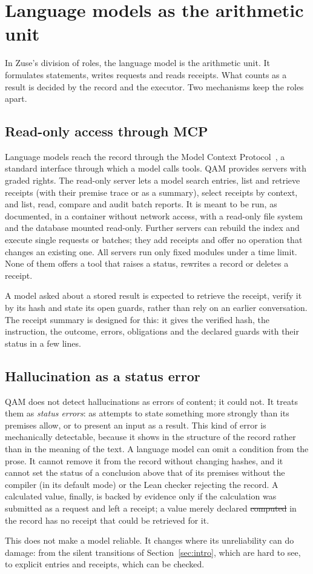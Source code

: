 \section{Language models as the arithmetic unit}\label{sec:llm}

In Zuse's division of roles, the language model is the arithmetic unit. It formulates statements, writes requests and reads receipts.
What counts as a result is decided by the record and the executor. Two mechanisms keep the roles apart.

\subsection{Read-only access through MCP}

Language models reach the record through the Model Context Protocol~\cite{mcp}, a standard interface through which a model calls
tools. QAM provides servers with graded rights. The read-only server lets a model search entries, list and retrieve receipts (with
their premise trace or as a summary), select receipts by context, and list, read, compare and audit batch reports. It is meant to be run, as documented, in a
container without network access, with a read-only file system and the database mounted read-only. Further servers can rebuild the index and execute
single requests or batches; they add receipts and offer no operation that changes an existing one. All servers run only fixed modules
under a time limit. None of them offers a tool that raises a status, rewrites a record or deletes a receipt.

A model asked about a stored result is expected to retrieve the receipt, verify it by its hash and state its open guards, rather than
rely on an earlier conversation. The receipt summary is designed for this: it gives the verified hash, the instruction, the outcome,
errors, obligations and the declared guards with their status in a few lines.

\subsection{Hallucination as a status error}

QAM does not detect hallucinations as errors of content; it could not. It treats them as \emph{status errors}: as attempts to state
something more strongly than its premises allow, or to present an input as a result. This kind of error is mechanically detectable,
because it shows in the structure of the record rather than in the meaning of the text. A language model can omit a condition from the
prose. It cannot remove it from the record without changing hashes, and it cannot set the status of a conclusion above that of its
premises without the compiler (in its default mode) or the Lean checker rejecting the record. A calculated value, finally, is backed
by evidence only if the calculation was submitted as a request and left a receipt; a value merely declared \st{computed} in the record
has no receipt that could be retrieved for it.

This does not make a model reliable. It changes where its unreliability can do damage: from the silent transitions of
Section~\ref{sec:intro}, which are hard to see, to explicit entries and receipts, which can be checked.
